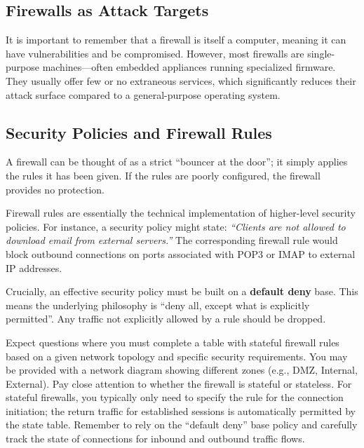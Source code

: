 \subsection{Firewalls as Attack Targets}

It is important to remember that a firewall is itself a computer, meaning it can have vulnerabilities and be compromised. However, most firewalls are single-purpose machines---often embedded appliances running specialized firmware. They usually offer few or no extraneous services, which significantly reduces their attack surface compared to a general-purpose operating system.

\subsection{Security Policies and Firewall Rules}

A firewall can be thought of as a strict ``bouncer at the door''; it simply applies the rules it has been given. If the rules are poorly configured, the firewall provides no protection.

Firewall rules are essentially the technical implementation of higher-level security policies. For instance, a security policy might state: \textit{``Clients are not allowed to download email from external servers.''} The corresponding firewall rule would block outbound connections on ports associated with POP3 or IMAP to external IP addresses.

Crucially, an effective security policy must be built on a \textbf{default deny} base. This means the underlying philosophy is ``deny all, except what is explicitly permitted''. Any traffic not explicitly allowed by a rule should be dropped.

\begin{tcolorbox}[colback=blue!5!white,colframe=blue!75!black,title=Exam Insight]
Expect questions where you must complete a table with stateful firewall rules based on a given network topology and specific security requirements. You may be provided with a network diagram showing different zones (e.g., DMZ, Internal, External). Pay close attention to whether the firewall is stateful or stateless. For stateful firewalls, you typically only need to specify the rule for the connection initiation; the return traffic for established sessions is automatically permitted by the state table. Remember to rely on the ``default deny'' base policy and carefully track the state of connections for inbound and outbound traffic flows.
\end{tcolorbox}

